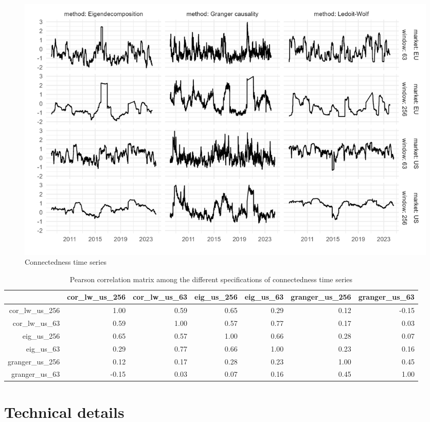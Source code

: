 \documentclass[12pt]{article}
\begin{document}
\begin{figure}
	\centering
	\includegraphics[scale = 0.8]{img/connect_ts_app.png}
	\caption{Connectedness time series}
	\label{figure:connect_ts_app}
\end{figure}

\begin{table}[ht]
	\centering
	\begin{tabular}{rrrrrrr}
		\hline
		& cor\_lw\_us\_256 & cor\_lw\_us\_63 & eig\_us\_256 & eig\_us\_63 & granger\_us\_256 & granger\_us\_63 \\ 
		\hline
		cor\_lw\_us\_256 & 1.00 & 0.59 & 0.65 & 0.29 & 0.12 & -0.15 \\ 
		cor\_lw\_us\_63 & 0.59 & 1.00 & 0.57 & 0.77 & 0.17 & 0.03 \\ 
		eig\_us\_256 & 0.65 & 0.57 & 1.00 & 0.66 & 0.28 & 0.07 \\ 
		eig\_us\_63 & 0.29 & 0.77 & 0.66 & 1.00 & 0.23 & 0.16 \\ 
		granger\_us\_256 & 0.12 & 0.17 & 0.28 & 0.23 & 1.00 & 0.45 \\ 
		granger\_us\_63 & -0.15 & 0.03 & 0.07 & 0.16 & 0.45 & 1.00 \\ 
		\hline
	\end{tabular}
		\caption{Pearson correlation matrix among the different specifications of connectedness time series}
		\label{figure:cor_matrix}
\end{table}

\section{Technical details}\label{appendix:technical}
\end{document}
